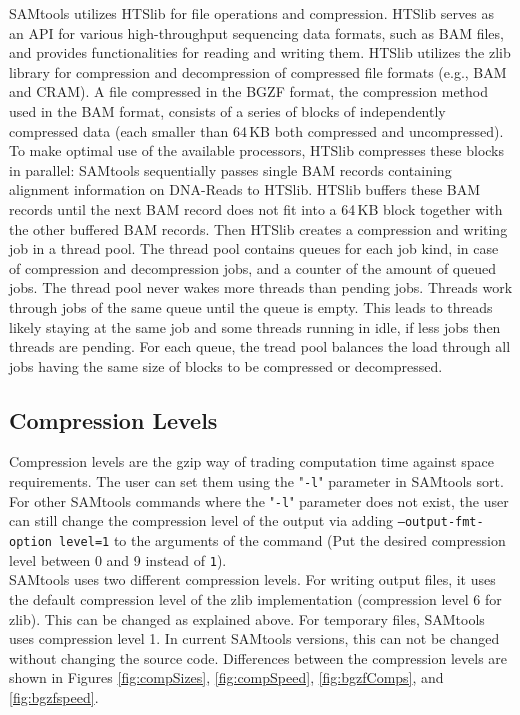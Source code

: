 SAMtools utilizes HTSlib for file operations and compression. HTSlib serves as an API for various high-throughput sequencing data formats, such as BAM files, and  provides functionalities for reading and writing them. HTSlib utilizes the zlib library for compression and decompression of compressed file formats (e.g., BAM and CRAM). A file compressed in the BGZF format, the compression method used in the BAM format, consists of a series of blocks of independently compressed data (each smaller than 64\,KB both compressed and uncompressed). To make optimal use of the available processors, HTSlib compresses these blocks in parallel: SAMtools sequentially passes single BAM records containing alignment information on DNA-Reads to HTSlib. HTSlib buffers these BAM records until the next BAM record does not fit into a 64\,KB block together with the other buffered BAM records. Then HTSlib creates a compression and writing job in a thread pool. The thread pool contains queues for each job kind, in case of \sort compression and decompression jobs, and a counter of the amount of queued jobs. The thread pool never wakes more threads than pending jobs. Threads work through jobs of the same queue until the queue is empty. This leads to threads likely staying at the same job and some threads running in idle, if less jobs then threads are pending. For each queue, the tread pool balances the load through all jobs having the same size of blocks to be compressed or decompressed. 


\subsection{Compression Levels}
Compression levels are the gzip way of trading computation time against space requirements. The user can set them using the "\texttt{-l}" parameter in SAMtools sort. For other SAMtools commands where the "\texttt{-l}" parameter does not exist, the user can still change the compression level of the output via adding \texttt{--output-fmt-option level=1} to the arguments of the command (Put the desired compression level between 0 and 9 instead of \texttt{1}). \\
SAMtools uses two different compression levels. For writing output files, it uses the default compression level of the zlib implementation (compression level 6 for zlib). This can be changed as explained above. For temporary files, SAMtools uses compression level 1. In current SAMtools versions, this can not be changed without changing the source code.
Differences between the compression levels are shown in Figures \ref{fig:compSizes}, \ref{fig:compSpeed}, \ref{fig:bgzfComps}, and \ref{fig:bgzfspeed}.

